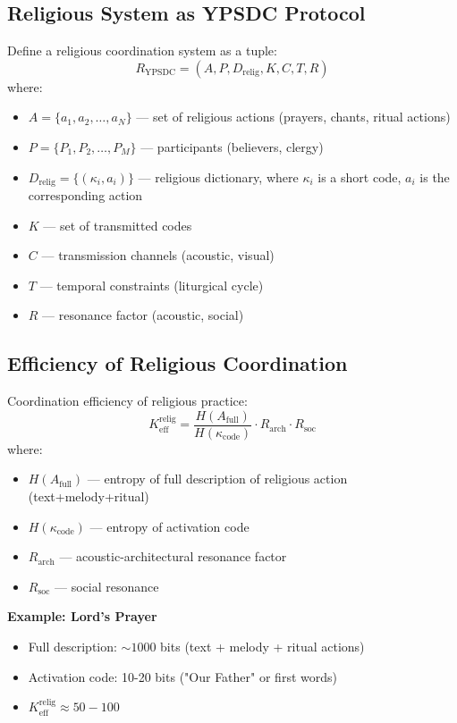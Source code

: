 \documentclass[12pt,a4paper]{article}
\begin{document}
	\subsection{Religious System as YPSDC Protocol}
	
	Define a religious coordination system as a tuple:
	\[
	R_{\mathrm{YPSDC}} = (A, P, D_{\mathrm{relig}}, K, C, T, R)
	\]
	where:
	\begin{itemize}
		\item $A = \{a_1, a_2, \ldots, a_N\}$ — set of religious actions (prayers, chants, ritual actions)
		\item $P = \{P_1, P_2, \ldots, P_M\}$ — participants (believers, clergy)
		\item $D_{\mathrm{relig}} = \{(\kappa_i, a_i)\}$ — religious dictionary, where $\kappa_i$ is a short code, $a_i$ is the corresponding action
		\item $K$ — set of transmitted codes
		\item $C$ — transmission channels (acoustic, visual)
		\item $T$ — temporal constraints (liturgical cycle)
		\item $R$ — resonance factor (acoustic, social)
	\end{itemize}
	
	\subsection{Efficiency of Religious Coordination}
	
	Coordination efficiency of religious practice:
	\[
	K_{\mathrm{eff}}^{\mathrm{relig}} = \frac{H(A_{\mathrm{full}})}{H(\kappa_{\mathrm{code}})} \cdot R_{\mathrm{arch}} \cdot R_{\mathrm{soc}}
	\]
	where:
	\begin{itemize}
		\item $H(A_{\mathrm{full}})$ — entropy of full description of religious action (text+melody+ritual)
		\item $H(\kappa_{\mathrm{code}})$ — entropy of activation code
		\item $R_{\mathrm{arch}}$ — acoustic-architectural resonance factor
		\item $R_{\mathrm{soc}}$ — social resonance
	\end{itemize}
	
	\textbf{Example: Lord's Prayer}
	\begin{itemize}
		\item Full description: $\sim 1000$ bits (text + melody + ritual actions)
		\item Activation code: 10-20 bits ("Our Father" or first words)
		\item $K_{\mathrm{eff}}^{\mathrm{relig}} \approx 50-100$
	\end{itemize}
	
\end{document}
